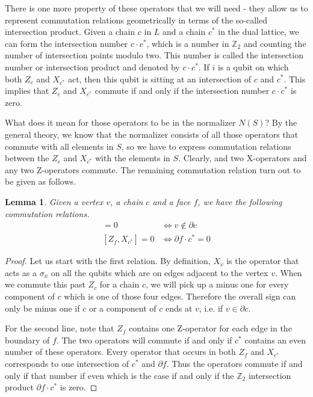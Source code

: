 \documentclass[a4paper, draft]{article}
\theoremstyle{own}
\newtheorem{lem}[thm]{Lemma}
\theoremstyle{remark}
\newcommand{\Z}{\mathbb{Z}}
\begin{document}
There is one more property of these operators that we will need - they allow us to represent commutation relations geometrically in terms of the so-called intersection product. Given a chain $c$ in $L$ and a chain $c^*$ in the dual lattice, we can form the intersection number $c \cdot c^*$, which is a number in $\Z_2$ and counting the number of intersection points modulo two. This number is called the intersection number or intersection product and denoted by $c \cdot c^*$. If $i$ is a qubit on which both $Z_c$ and $X_{c^*}$ act, then this qubit is sitting at an intersection of $c$ and $c^*$. This implies that $Z_c$ and $X_{c^*}$ commute if and only if the intersection number $c \cdot c^*$ is zero.

What does it mean for those operators to be in the normalizer $N(S)$? By the general theory, we know that the normalizer consists of all those operators that commute with all elements in $S$, so we have to express commutation relations between the $Z_c$ and $X_{c^*}$ with the elements in $S$. Clearly, and two X-operators and any two Z-operators commute. The remaining commutation relation turn out to be given as follows.

\begin{lem}\label{lem:commutators}
Given a vertex $v$, a chain $c$ and a face $f$, we have the following commutation relations.
\begin{align*}
[ Z_c, X_v  ] = 0 & \Leftrightarrow v \notin \partial c \\
[ Z_f, X_{c^*}  ] = 0 & \Leftrightarrow \partial f  \cdot c^* = 0
\end{align*}
\end{lem}

\begin{proof}
Let us start with the first relation. By definition, $X_v$ is the operator that acts as a $\sigma_x$ on all the qubits which are on edges adjacent to the vertex $v$. When we commute this past $Z_c$ for a chain $c$, we will pick up a minus one for every component of $c$ which is one of those four edges. Therefore the overall sign can only be minus one if $c$ or a component of $c$ ends at $v$, i.e. if $v \in \partial c$. 

For the second line, note that $Z_f$ contains one Z-operator for each edge in the boundary of $f$. The two operators will commute if and only if $c^*$ contains an even number of these operators. Every operator that occurs in both $Z_f$ and $X_{c^*}$ corresponds to one intersection of $c^*$ and $\partial f$. Thus the operators commute if and only if that number if even which is the case if and only if the $\Z_2$ intersection product $\partial f \cdot c^*$ is zero. 
\end{proof} 
\end{document}
